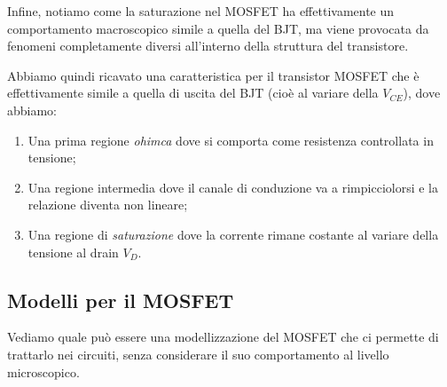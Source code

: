 \documentclass[a4paper,11pt]{article}
\begin{document}
\begin{itemize}
\begin{itemize}
Infine, notiamo come la saturazione nel MOSFET ha effettivamente un comportamento macroscopico simile a quella del BJT, ma viene provocata da fenomeni completamente diversi all'interno della struttura del transistore.

\end{itemize}

\end{itemize}

Abbiamo quindi ricavato una caratteristica per il transistor MOSFET che è effettivamente simile a quella di uscita del BJT (cioè al variare della $V_{CE}$), dove abbiamo:
\begin{enumerate}
	\item Una prima regione \textit{ohimca} dove si comporta come resistenza controllata in tensione;
	\item Una regione intermedia dove il canale di conduzione va a rimpicciolorsi e la relazione diventa non lineare;
	\item Una regione di \textit{saturazione} dove la corrente rimane costante al variare della tensione al drain $V_D$.
\end{enumerate}

\subsection{Modelli per il MOSFET}
Vediamo quale può essere una modellizzazione del MOSFET che ci permette di trattarlo nei circuiti, senza considerare il suo comportamento al livello microscopico.
\end{document}
